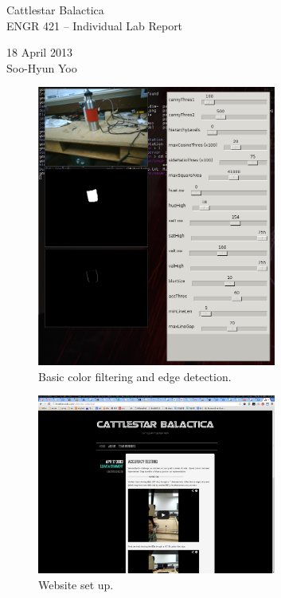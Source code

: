 \documentclass[12pt,letterpaper]{article}
\begin{document}
\begin{titlepage}
	\vspace*{4cm}
	\begin{flushright}
	{\huge
		Cattlestar Balactica \\ [1cm]
	}
	{\large
		ENGR 421 -- Individual Lab Report \\ [3cm]
	}
	\end{flushright}

	\begin{flushright}
	18 April 2013 \\
	Soo-Hyun Yoo
	\end{flushright}

\end{titlepage}

\newpage

\begin{figure}[!h]
	\centering
	\includegraphics[width=0.7\textwidth]{vision.png}
	\caption{Basic color filtering and edge detection.}
	\label{fig:vision}
\end{figure}

\begin{figure}[!h]
	\centering
	\includegraphics[width=0.7\textwidth]{website.png}
	\caption{Website set up.}
	\label{fig:website}
\end{figure}
\end{document}
